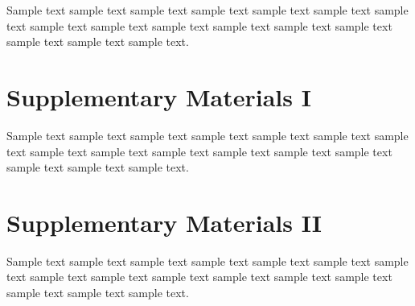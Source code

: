 \documentclass[11pt]{uonthesis}
\begin{document}
Sample text sample text sample text sample text sample text sample
text sample text sample text sample text sample text sample text
sample text sample text sample text sample text sample text.



\printbibliography

\begin{appendices}

\chapter{Supplementary Materials I}

Sample text sample text sample text sample text sample text sample
text sample text sample text sample text sample text sample text
sample text sample text sample text sample text sample text.

\chapter{Supplementary Materials II}

Sample text sample text sample text sample text sample text sample
text sample text sample text sample text sample text sample text
sample text sample text sample text sample text sample text.

\end{appendices}
\end{document}
